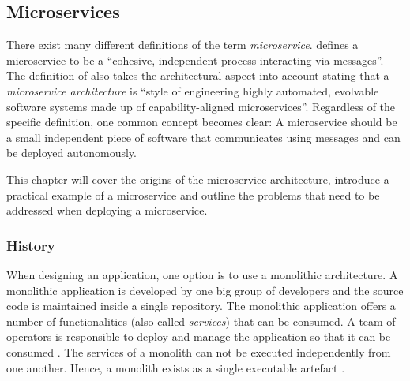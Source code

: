 
\subsection{Microservices}%
\label{sub:Microservices}

There exist many different definitions of the term \textit{microservice}.
\autocite{DragoniMicroservicesyesterdaytoday2016} defines a microservice to be
a \enquote{cohesive, independent process interacting via messages}. The
definition of \autocite{MikeAmundsenMicroserviceArchitecture2016} also takes
the architectural aspect into account stating that a \textit{microservice
architecture} is \enquote{style of engineering highly automated, evolvable
software systems made up of capability-aligned microservices}. Regardless of
the specific definition, one common concept becomes clear: A microservice
should be a small independent piece of software that communicates using
messages and can be deployed autonomously.

This chapter will cover the origins of the microservice architecture, introduce
a practical example of a microservice and outline the problems that need to be
addressed when deploying a microservice.

\subsubsection{History}%
\label{ssub:History}

When designing an application, one option is to use a monolithic architecture.
A monolithic application is developed by one big group of developers and the
source code is maintained inside a single repository. The monolithic
application offers a number of functionalities (also called \textit{services})
that can be consumed. A team of operators is responsible to deploy and manage
the application so that it can be consumed \autocite[p.
584]{VillamizarEvaluatingmonolithicmicroservice2015}. The services of a
monolith can not be executed independently from one another. Hence, a monolith
exists as a single executable artefact \autocite[p.
1]{DragoniMicroservicesyesterdaytoday2016}.

\begin{figure}[H]
\begin{center}
\end{center}
\caption{}
\label{fig:}
\end{figure}


